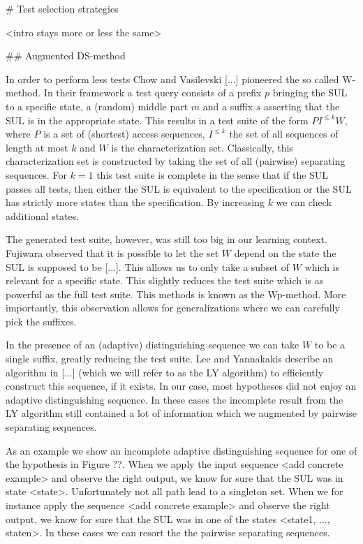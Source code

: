 # Test selection strategies

<intro stays more or less the same>


## Augmented DS-method

In order to perform less tests Chow and Vasilevski [...] pioneered the so called
W-method. In their framework a test query consists of a prefix $p$ bringing the
SUL to a specific state, a (random) middle part $m$ and a suffix $s$ asserting
that the SUL is in the appropriate state. This results in a test suite of the
form $P I^{\leq k} W$, where $P$ is a set of (shortest) access sequences,
$I^{\leq k}$ the set of all sequences of length at most $k$ and $W$ is the
characterization set. Classically, this characterization set is constructed by
taking the set of all (pairwise) separating sequences. For $k=1$ this test suite
is complete in the sense that if the SUL passes all tests, then either the SUL
is equivalent to the specification or the SUL has strictly more states than the
specification. By increasing $k$ we can check additional states.

The generated test suite, however, was still too big in our learning context.
Fujiwara observed that it is possible to let the set $W$ depend on the state the
SUL is supposed to be [...]. This allows us to only take a subset of $W$ which
is relevant for a specific state. This slightly reduces the test suite which is
as powerful as the full test suite. This methods is known as the Wp-method. More
importantly, this observation allows for generalizations where we can carefully
pick the suffixes.

In the presence of an (adaptive) distinguishing sequence we can take $W$ to be a
single suffix, greatly reducing the test suite. Lee and Yannakakis describe an
algorithm in [...] (which we will refer to as the LY algorithm) to efficiently
construct this sequence, if it exists. In our case, most hypotheses did not
enjoy an adaptive distinguishing sequence. In these cases the incomplete result
from the LY algorithm still contained a lot of information which we augmented by
pairwise separating sequences.

As an example we show an incomplete adaptive distinguishing sequence for one of
the hypothesis in Figure ??. When we apply the input sequence <add concrete
example> and observe the right output, we know for sure that the SUL was in
state <state>. Unfortunately not all path lead to a singleton set. When we for
instance apply the sequence <add concrete example> and observe the right output,
we know for sure that the SUL was in one of the states <state1, ..., staten>. In
these cases we can resort the the pairwise separating sequences.

